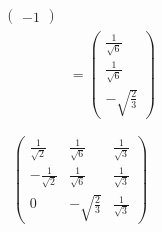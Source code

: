 \documentclass{article}
\begin{document}
\begin{enumerate}
\begin{align*}
\begin{pmatrix}
                                                  -1
                                                \end{pmatrix}                                           \\
                         & = \begin{pmatrix}
                               \frac{1}{\sqrt{6}} \\
                               \frac{1}{\sqrt{6}} \\
                               -\sqrt{\frac{2}{3}}
                             \end{pmatrix}
        \end{align*}

        \[\begin{pmatrix}
            \frac{1}{\sqrt{2}}  & \frac{1}{\sqrt{6}}  & \frac{1}{\sqrt{3}} \\
            -\frac{1}{\sqrt{2}} & \frac{1}{\sqrt{6}}  & \frac{1}{\sqrt{3}} \\
            0                   & -\sqrt{\frac{2}{3}} & \frac{1}{\sqrt{3}}
          \end{pmatrix}\]
\end{enumerate}
\end{document}
